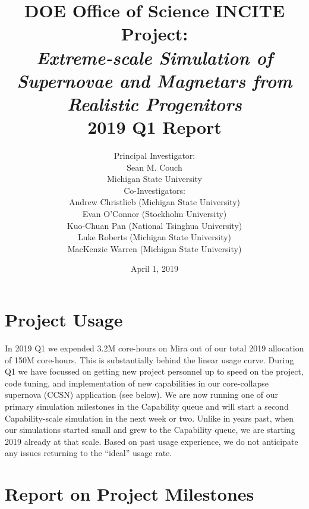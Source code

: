 \documentclass[12pt,titlepage]{article}
\title{DOE Office of Science INCITE Project:\\
{\it Extreme-scale Simulation of Supernovae and Magnetars from Realistic Progenitors}\\
2019 Q1 Report}
\author{Principal Investigator:\\Sean M. Couch\\
  Michigan State University \vspace{0.1in}\\
  Co-Investigators: \\
  Andrew Christlieb (Michigan State University) \\
  Evan O'Connor (Stockholm University)\\
  Kuo-Chuan Pan (National Tsinghua University) \\
  Luke Roberts (Michigan State University) \\
  MacKenzie Warren (Michigan State University) \\
}
\date{April 1, 2019}
\begin{document}
\maketitle


\section{Project Usage}




In 2019 Q1 we expended 3.2M core-hours on Mira out of our total 2019 allocation of 150M core-hours. 
This is substantially behind the linear usage curve.
During Q1 we have focussed on getting new project personnel up to speed on the project, code tuning, and implementation of new capabilities in our core-collapse supernova (CCSN) application (see below). 
We are now running one of our primary simulation milestones in the Capability queue and will start a second Capability-scale simulation in the next week or two. Unlike in years past, when our simulations started small and grew to the Capability queue, we are starting 2019 already at that scale. 
Based on past usage experience, we do not anticipate any issues returning to the ``ideal'' usage rate. 

\section{Report on Project Milestones}
\end{document}
